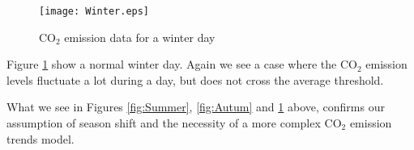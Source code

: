\documentclass[Main]{subfiles}
\begin{document}
		\begin{figure}[H]
			\centering
			\texttt{[image: Winter.eps]}
			\caption{CO$_2$ emission data for a winter day}
			\label{fig:Winter}
		\end{figure}

		Figure \ref{fig:Winter} show a normal winter day.
		Again we see a case where the CO$_2$ emission levels fluctuate a lot during a day, but does not cross the average threshold.

		What we see in Figures \ref{fig:Summer}, \ref{fig:Autum} and \ref{fig:Winter} above, confirms our assumption of season shift and the necessity of a more complex CO$_2$ emission trends model.
		
\end{document}

